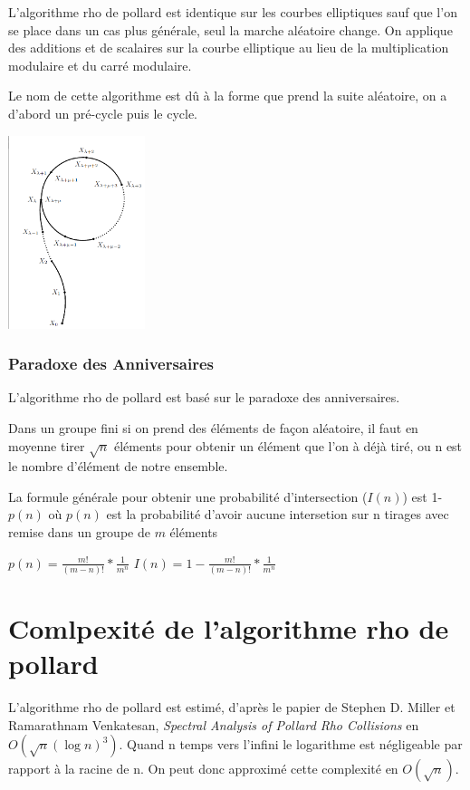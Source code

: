 \documentclass[a4paper,10pt]{report}
\begin{document}
L'algorithme rho de pollard est identique sur les courbes elliptiques sauf que l'on se place dans un cas plus générale,
seul la marche aléatoire change. On applique des additions et de scalaires sur la courbe elliptique au lieu de la multiplication modulaire et du carré modulaire.

Le nom de cette algorithme est dû à la forme que prend la suite aléatoire, on a d'abord un pré-cycle puis le cycle.

\begin{center}
 \includegraphics[width=4cm]{dessin_rho_pollard_bon.png}
\end{center}

\subsection{Paradoxe des Anniversaires}
L'algorithme rho de pollard est basé sur le paradoxe des anniversaires.

 Dans un groupe fini si on prend des éléments de façon aléatoire,
il faut en moyenne tirer $\sqrt{n}$ éléments pour obtenir un élément que l'on à déjà tiré, ou n est le nombre d'élément de notre ensemble.

La formule générale pour obtenir une probabilité d'intersection ($I(n)$) est 1-$p(n)$ où $p(n)$ est la probabilité d'avoir aucune intersetion sur n tirages avec remise dans un groupe de $m$ éléments
\begin{center}
    $p(n) = \frac{m!}{(m - n)!}*\frac{1}{m^n}$
    $I(n) = 1 - \frac{m!}{(m - n)!}*\frac{1}{m^n}$
\end{center}


\chapter{Comlpexité de l'algorithme rho de pollard}

L'algorithme rho de pollard est estimé, d'après le papier de Stephen D. Miller et Ramarathnam Venkatesan, \textit{Spectral Analysis of Pollard Rho Collisions} en $O(\sqrt{n}(\log{n})^3)$. 
Quand n temps vers l'infini le logarithme est négligeable par rapport à la racine de n. On peut donc approximé cette complexité en $O(\sqrt{n})$.
\end{document}
